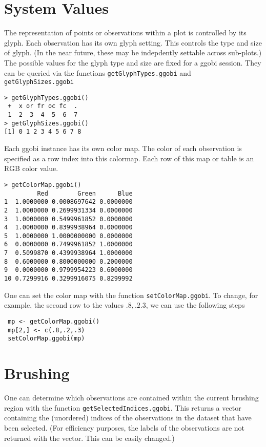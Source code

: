 \documentclass{article}
\def\SFunction#1{{\texttt{\red #1}}}
\begin{document}
\section{}


\section{System Values}
The representation of points or observations within a plot is
controlled by its glyph.  Each observation has its own glyph
setting. This controls the type  and size of glyph.
(In the near future, these may be indepdently settable across
sub-plots.)
The possible values for the glyph type and size
are fixed for a ggobi session.
They can be queried via the functions
\SFunction{getGlyphTypes.ggobi}
and 
\SFunction{getGlyphSizes.ggobi}

\begin{verbatim}
> getGlyphTypes.ggobi()
 +  x or fr oc fc  . 
 1  2  3  4  5  6  7 
> getGlyphSizes.ggobi()
[1] 0 1 2 3 4 5 6 7 8
\end{verbatim}

Each ggobi instance has its own color map.  The color of each
observation is specified as a row index into this colormap.  Each row
of this map or table is an RGB color value.

\begin{verbatim}
> getColorMap.ggobi()
         Red        Green      Blue
1  1.0000000 0.0008697642 0.0000000
2  1.0000000 0.2699931334 0.0000000
3  1.0000000 0.5499961852 0.0000000
4  1.0000000 0.8399938964 0.0000000
5  1.0000000 1.0000000000 0.0000000
6  0.0000000 0.7499961852 1.0000000
7  0.5099870 0.4399938964 1.0000000
8  0.6000000 0.8000000000 0.2000000
9  0.0000000 0.9799954223 0.6000000
10 0.7299916 0.3299916075 0.8299992
\end{verbatim}

One can set the color map with the function
\SFunction{setColorMap.ggobi}.  To change, for example, the second row
to the values $.8, .2. 3$, we can use the following steps
\begin{verbatim}
 mp <- getColorMap.ggobi()
 mp[2,] <- c(.8,.2,.3)
 setColorMap.ggobi(mp)
\end{verbatim}



\section{Brushing}
One can determine which observations are contained within the current
brushing region with the function
\SFunction{getSelectedIndices.ggobi}.  This returns a vector
containing the (unordered) indices of the observations in the dataset
that have been selected.  
(For efficiency purposes, the labels of the observations
are not returned with the vector. This can be easily changed.)
\end{document}
